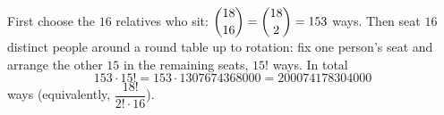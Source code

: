 First choose the $16$ relatives who sit: $\dbinom{18}{16}=\dbinom{18}{2}=153$ ways. Then seat $16$ distinct people around a round table up to rotation: fix one person's seat and arrange the other $15$ in the remaining seats, $15!$ ways. In total
\[
153\cdot15!=153\cdot1307674368000=\boxed{200074178304000}
\]
ways (equivalently, $\dfrac{18!}{2!\cdot16}$).
